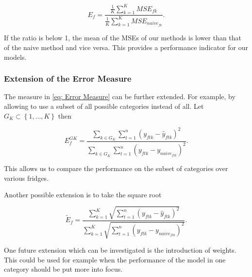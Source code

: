 \begin{equation}
E_f=\frac{\frac{1}{K}\sum_{k=1}^K MSE_{fk}}{\frac{1}{K}\sum_{k=1}^K MSE_{naive_{fk}}}.
\label{eq: Error Measure MSE}
\end{equation}

If the ratio is below 1, the mean of the MSEs of our methods is lower than that of the naive method and vice versa. This provides a performance indicator for our models. 

\subsubsection{Extension of the Error Measure}
\label{sec:Error Measure Extension}

The measure in \ref{eq: Error Measure} can be further extended. For example, by allowing to use a subset of all possible categories instead of all. Let $G_K \subset \left\{1,\ldots,K\right\}$ then

\begin{equation}
E^{GK}_{f}=\frac{\sum_{k \in G_K}\sum_{t=1}^n(y_{ftk}-\hat{y}_{ftk})^2}{\sum_{k \in G_K}\sum_{t=1}^n(y_{ftk}-y_{naive_{ftk}})^2}.
\label{eq: Error Measure Subsets}
\end{equation}

This allows us to compare the performance on the subset of categories over various fridges. 

Another possible extension is to take the square root

\begin{equation}
\widetilde{E}_f=\frac{\sum_{k=1}^{K}\sqrt{\sum_{t=1}^n(y_{ftk}-\hat{y}_{ftk})^2}}{\sum_{k=1}^{K}\sqrt{\sum_{t=1}^n(y_{ftk}-y_{naive_{ftk}})^2}}.
\label{eq: Error Measure Sqrt} 
\end{equation}

One future extension which can be investigated is the introduction of weights. This could be used for example when the performance of the model in one category should be put more into focus. 